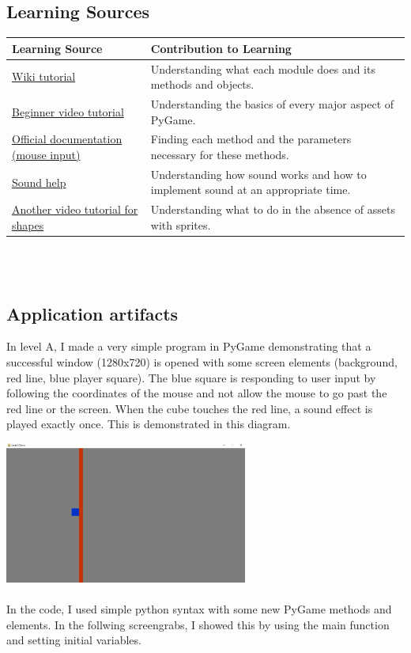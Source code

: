 \documentclass[a4paper, 11pt]{report}
\begin{document}
\subsection{Learning Sources}
\begin{tabular}{|p{}|p{}|}
	\hline
	Learning Source & Contribution to Learning\\
	\hline
	\href{https://www.pygame.org/wiki/tutorials}{Wiki tutorial} & Understanding what each module does and its methods and objects.\\
	\hline
	\href{https://www.youtube.com/watch?v=jO6qQDNa2UY}{Beginner video tutorial} & Understanding the basics of every major aspect of PyGame.\\
	\hline
	\href{https://www.pygame.org/docs/ref/mouse.html}{Official documentation (mouse input)} & Finding each method and the parameters necessary for these methods.\\
	\hline
	\href{https://opensource.com/article/20/9/add-sound-python-game}{Sound help} & Understanding how sound works and how to implement sound at an appropriate time.\\
	\hline
	\href{https://www.youtube.com/watch?v=YDP1Hk7uZFAs}{Another video tutorial for shapes} & Understanding what to do in the absence of assets with sprites.\\
	\hline
\end{tabular}
\\
\\
\subsection{Application artifacts}
In level A, I made a very simple program in PyGame demonstrating that a successful window (1280x720) is opened with some screen elements (background, red line, blue player square). The blue square is responding to user input by following the coordinates of the mouse and not allow the mouse to go past the red line or the screen. When the cube touches the red line, a sound effect is played exactly once. This is demonstrated in this diagram.

\includegraphics[width=8cm]{Level A Demo}\\[1cm]
\\
In the code, I used simple python syntax with some new PyGame methods and elements. In the follwing screengrabs, I showed this by using the main function and setting initial variables.
\end{document}
